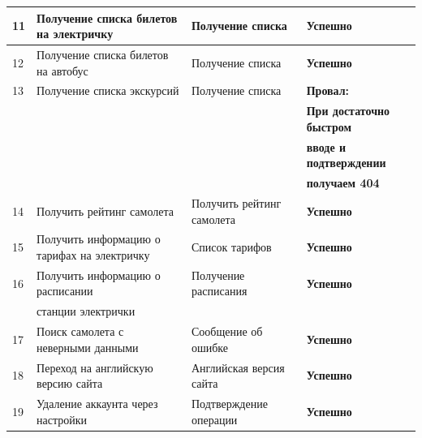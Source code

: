 ﻿\documentclass[article]{article}
\begin{document}
\begin{tabular}{l|l|l|l}
\hline
	11 & Получение списка билетов на электричку & Получение списка & \bf{Успешно}\\
	\hline
	12 & Получение списка билетов на автобус & Получение списка & \bf{Успешно}\\
\hline
	13 & Получение списка экскурсий & Получение списка & \bf{Провал: }\\
	   & & & \bf{При достаточно быстром } \\
	    & & & \bf{вводе и подтверждении} \\
	     & & & \bf{получаем 404} \\
\hline
	14 & Получить рейтинг самолета & Получить рейтинг самолета & \bf{Успешно}\\
\hline
	15 & Получить информацию о тарифах на электричку & Список тарифов  & \bf{Успешно}\\
\hline
	16 & Получить информацию о расписании  & Получение расписания & \bf{Успешно}\\
	&станции электрички &  & \\
\hline
	17 & Поиск самолета с неверными данными & Сообщение об ошибке & \bf{Успешно}\\
\hline
	18 & Переход на английскую версию сайта & Английская версия сайта & \bf{Успешно}\\
	\hline
	19 & Удаление аккаунта через настройки & Подтверждение операции & \bf{Успешно}
\end{tabular}
\end{document}
